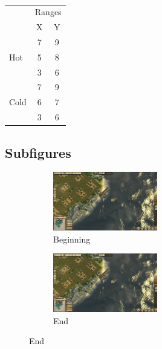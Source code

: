 \documentclass[11pt]{article}
\begin{document}
    \begin{table}
        \caption{}
        \begin{center}
            \begin{tabular}{| l | c | c |}
                \hline
                & \multicolumn{2}{c}{Ranges}\\
                & X & Y \\
                \hline
                \multirow{3}{*}{Hot} & 7 & 9 \\
                & 5 & 8 \\
                & 3 & 6 \\
                \hline
                \multirow{3}{*}{Cold} & 7 & 9 \\
                & 6 & 7 \\
                & 3 & 6 \\
                \hline

            \end{tabular}
            \label{table_sapcing}
        \end{center}
    \end{table}

    \subsection{Subfigures}

    \begin{figure}[htbp]
        \centering
            \caption{Default}
                \begin{subfigure}[b]{0.5\textwidth}
                    \centering
                    \includegraphics[width=0.5\textwidth]{Anno 1404 - History Edition2021-2-2-1-53-42}
                    \caption{Beginning}
                    \label{subfig:fig1}
                \end{subfigure}%
                \begin{subfigure}[b]{0.5\textwidth}
                    \centering
                    \includegraphics[width=0.5\textwidth]{Anno 1404 - History Edition2021-2-2-1-53-42}
                    \caption{End}
                    \label{subfig:fig2}
                \end{subfigure}%
            \label{fig:fig2}
    \end{figure}

    \clearpage
    
    
\end{document}

